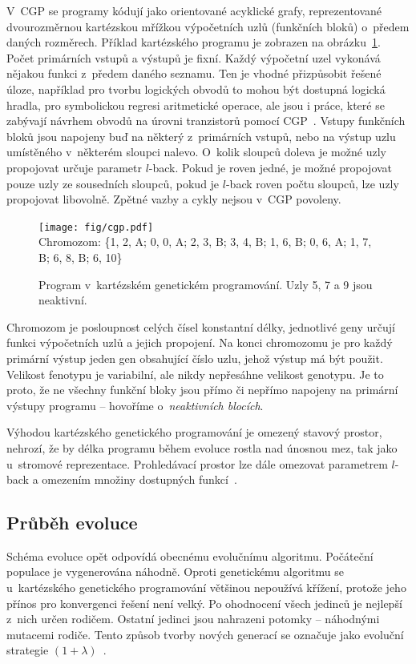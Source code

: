V~CGP se programy kódují jako orientované acyklické grafy, reprezentované dvourozměrnou kartézskou mřížkou výpočetních uzlů (funkčních bloků) o~předem daných rozměrech. Příklad kartézského programu je zobrazen na obrázku~\ref{obrCGP}. Počet primárních vstupů a výstupů je fixní. Každý výpočetní uzel vykonává nějakou funkci z~předem daného seznamu. Ten je vhodné přizpůsobit řešené úloze, například pro tvorbu logických obvodů to mohou být dostupná logická hradla, pro symbolickou regresi aritmetické operace, ale jsou i práce, které se zabývají návrhem obvodů na úrovni tranzistorů pomocí CGP~\cite{Mrazek}. Vstupy funkčních bloků jsou napojeny buď na některý z~primárních vstupů, nebo na výstup uzlu umístěného v~některém sloupci nalevo. O~kolik sloupců doleva je možné uzly propojovat určuje parametr $l$-back. Pokud je roven jedné, je možné propojovat pouze uzly ze sousedních sloupců, pokud je $l$-back roven počtu sloupců, lze uzly propojovat libovolně. Zpětné vazby a cykly nejsou v~CGP povoleny.

\begin{figure}[htb]
    \centering\texttt{[image: fig/cgp.pdf]} \\
    {\scriptsize{}Chromozom: \{1, 2, A; 0, 0, A; 2, 3, B; 3, 4, B; 1, 6, B; 0, 6, A; 1, 7, B; 6, 8, B; 6, 10\}}
    \caption{Program v~kartézském genetickém programování. Uzly 5, 7 a 9 jsou neaktivní.}
    \label{obrCGP}
\end{figure}

Chromozom je posloupnost celých čísel konstantní délky, jednotlivé geny určují funkci výpočetních uzlů a jejich propojení. Na konci chromozomu je pro každý primární výstup jeden gen obsahující číslo uzlu, jehož výstup má být použit. Velikost fenotypu je variabilní, ale nikdy nepřesáhne velikost genotypu. Je to proto, že ne všechny funkční bloky jsou přímo či nepřímo napojeny na primární výstupy programu -- hovoříme o~\emph{neaktivních blocích}.

Výhodou kartézského genetického programování je omezený stavový prostor, nehrozí, že by délka programu během evoluce rostla nad únosnou mez, tak jako u~stromové reprezentace. Prohledávací prostor lze dále omezovat parametrem $l$-back a omezením množiny dostupných funkcí~\cite{ZelenaCGP, Modra, HandbookGP}.

\subsection{Průběh evoluce}
\label{secCGPEvo}

Schéma evoluce opět odpovídá obecnému evolučnímu algoritmu. Počáteční populace je vygenerována náhodně. Oproti genetickému algoritmu se u~kartézského genetického programování většinou nepoužívá křížení, protože jeho přínos pro konvergenci řešení není velký. Po ohodnocení všech jedinců je nejlepší z~nich určen rodičem. Ostatní jedinci jsou nahrazeni potomky -- náhodnými mutacemi rodiče. Tento způsob tvorby nových generací se označuje jako evoluční strategie $(1 + \lambda)$~\cite{Modra}.

